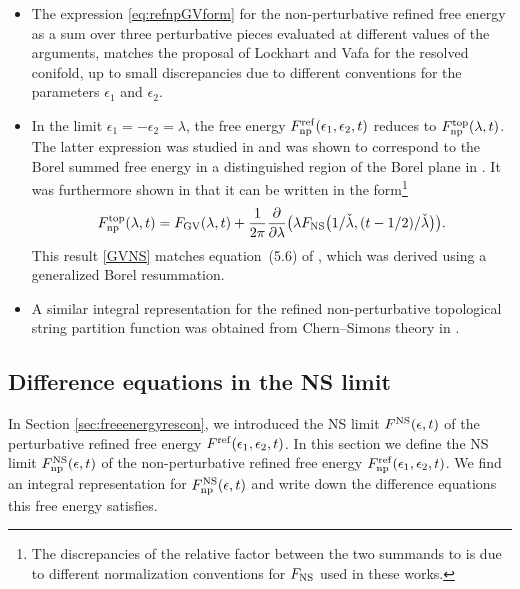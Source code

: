 \documentclass[pdftex]{sigma}
\numberwithin{equation}{section}
\begin{document}
\begin{Remark}\quad
\begin{itemize}\itemsep=0pt
\item
 The expression \eqref{eq:refnpGVform} for the non-perturbative refined free energy as a sum over three perturbative pieces evaluated at different values of the arguments, matches the proposal of Lockhart and Vafa \cite{Lockhart:2012vp} for the resolved conifold, up to small discrepancies due to different conventions for the parameters $\epsilon_1$ and $\epsilon_2$.

\item In the limit $\epsilon_1=-\epsilon_2 = \lambda$, the free energy $F^{{\rm ref}}_{{\rm np}}(\epsilon_1,\epsilon_2,t)$ reduces to $F^{\rm top}_{{\rm np}}(\lambda,t)$. The latter expression was studied in \cite{Alim:2021ukq} and was shown to correspond to the Borel summed free energy in a distinguished region of the Borel plane in \cite{ASTT21}. It was furthermore shown in \cite{Alim:2021ukq} that it can be written in the form\footnote{The discrepancies of the relative factor between the two summands to \cite{Alim:2021ukq,ASTT21, Hatsuda:2015owa} is due to different normalization conventions for $F_{{\rm NS}}$ used in these works.}
 \begin{equation}\label{GVNS}
F^{\rm top}_{{\rm np}}(\lambda,t)= F_{{\rm GV}}(\lambda,t) + \frac{1}{2\pi} \frac{\partial}{\partial \lambda} \big(\lambda F_{{\rm NS}} \big(1/\check{\lambda},(t-1/2)/\check{\lambda}\big)\big).
\end{equation}
This result \eqref{GVNS} matches equation~(5.6) of \cite{Hatsuda:2015owa}, which was derived using a generalized Borel resummation.

\item A similar integral representation for the refined non-perturbative topological string partition function was obtained from Chern--Simons theory in \cite{Krefl:2015vna}.
\end{itemize}
\end{Remark}


\subsection{Difference equations in the NS limit}\label{NSlimitsec}

In Section \ref{sec:freeenergyrescon}, we introduced the NS limit $F^{\rm NS}(\epsilon,t)$ of the perturbative refined free energy $F^{\rm ref}(\epsilon_1,\epsilon_2,t)$. In this section we define the NS limit $F^{\rm NS}_{{\rm np}}(\epsilon,t)$ of the non-perturbative refined free energy $F^{\rm ref}_\mathrm{np}(\epsilon_1,\epsilon_2,t)$. We find an integral representation for $F^{\rm NS}_{{\rm np}}(\epsilon,t)$ and write down the difference equations this free energy satisfies.
\end{document}
